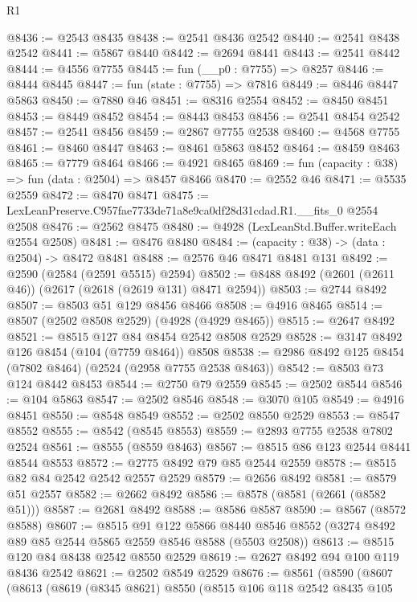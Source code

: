 \begin{lexlean}{R1}
\begin{coremodule}
@8436 := @2543 @8435
@8438 := @2541 @8436 @2542
@8440 := @2541 @8438 @2542
@8441 := @5867 @8440
@8442 := @2694 @8441
@8443 := @2541 @8442
@8444 := @4556 @7755
@8445 := fun (__p0 : @7755) => @8257
@8446 := @8444 @8445
@8447 := fun (state : @7755) => @7816
@8449 := @8446 @8447 @5863
@8450 := @7880 @46
@8451 := @8316 @2554
@8452 := @8450 @8451
@8453 := @8449 @8452
@8454 := @8443 @8453
@8456 := @2541 @8454 @2542
@8457 := @2541 @8456
@8459 := @2867 @7755 @2538
@8460 := @4568 @7755
@8461 := @8460 @8447
@8463 := @8461 @5863 @8452
@8464 := @8459 @8463
@8465 := @7779 @8464
@8466 := @4921 @8465
@8469 := fun (capacity : @38) => fun (data : @2504) => @8457 @8466
@8470 := @2552 @46
@8471 := @5535 @2559
@8472 := @8470 @8471
@8475 := LexLeanPreserve.C957fae7733de71a8e9ca0df28d31cdad.R1.__fits_0 @2554 @2508
@8476 := @2562 @8475
@8480 := @4928 (LexLeanStd.Buffer.writeEach @2554 @2508)
@8481 := @8476 @8480
@8484 := (capacity : @38) -> (data : @2504) -> @8472 @8481
@8488 := @2576 @46 @8471 @8481 @131
@8492 := @2590 (@2584 (@2591 @5515) @2594)
@8502 := @8488 @8492 (@2601 (@2611 @46)) (@2617 (@2618 (@2619 @131) @8471 @2594))
@8503 := @2744 @8492
@8507 := @8503 @51 @129 @8456 @8466
@8508 := @4916 @8465
@8514 := @8507 (@2502 @8508 @2529) (@4928 (@4929 @8465))
@8515 := @2647 @8492
@8521 := @8515 @127 @84 @8454 @2542 @8508 @2529
@8528 := @3147 @8492 @126 @8454 (@104 (@7759 @8464)) @8508
@8538 := @2986 @8492 @125 @8454 (@7802 @8464) (@2524 (@2958 @7755 @2538 @8463))
@8542 := @8503 @73 @124 @8442 @8453
@8544 := @2750 @79 @2559
@8545 := @2502 @8544
@8546 := @104 @5863
@8547 := @2502 @8546
@8548 := @3070 @105
@8549 := @4916 @8451
@8550 := @8548 @8549
@8552 := @2502 @8550 @2529
@8553 := @8547 @8552
@8555 := @8542 (@8545 @8553)
@8559 := @2893 @7755 @2538 @7802 @2524
@8561 := @8555 (@8559 @8463)
@8567 := @8515 @86 @123 @2544 @8441 @8544 @8553
@8572 := @2775 @8492 @79 @85 @2544 @2559
@8578 := @8515 @82 @84 @2542 @2542 @2557 @2529
@8579 := @2656 @8492
@8581 := @8579 @51 @2557
@8582 := @2662 @8492
@8586 := @8578 (@8581 (@2661 (@8582 @51)))
@8587 := @2681 @8492
@8588 := @8586 @8587
@8590 := @8567 (@8572 @8588)
@8607 := @8515
    @91
    @122
    @5866
    @8440
    @8546
    @8552
    (@3274 @8492 @89 @85 @2544 @5865 @2559 @8546 @8588 (@5503 @2508))
@8613 := @8515 @120 @84 @8438 @2542 @8550 @2529
@8619 := @2627 @8492 @94 @100 @119 @8436 @2542
@8621 := @2502 @8549 @2529
@8676 := @8561
    (@8590
      (@8607
        (@8613
          (@8619
            (@8345 @8621)
            @8550
            (@8515
              @106
              @118
              @2542
              @8435
              @105

\end{coremodule}
\end{lexlean}
